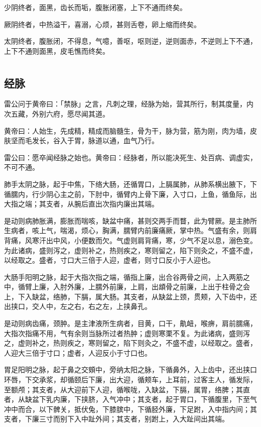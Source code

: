 \documentclass[a4paper,12pt,UTF8,twoside]{ctexbook}
\begin{document}
	少阴终者，面黑，齿长而垢，腹胀闭塞，上下不通而终矣。
	
	厥阴终者，中热溢干，喜溺，心烦，甚则舌卷，卵上缩而终矣。
	
	太阴终者，腹胀闭，不得息，气噫，善呕，呕则逆，逆则面赤，不逆则上下不通，上下不通则面黑，皮毛憔而终矣。
	
	\part{}
	\chapter{经脉}
	
	雷公问于黄帝曰：「禁脉」之言，凡刺之理，经脉为始，营其所行，制其度量，内次五藏，外别六府，愿尽闻其道。
	
	黄帝曰：人始生，先成精，精成而脑髓生，骨为干，脉为营，筋为刚，肉为墙，皮肤坚而毛发长，谷入于胃，脉道以通，血气乃行。
	
	雷公曰：愿卒闻经脉之始也。黄帝曰：经脉者，所以能决死生、处百病、调虚实，不可不通。
	
	肺手太阴之脉，起于中焦，下络大肠，还循胃口，上膈属肺，从肺系横出腋下，下循臑内，行少阴心主之前，下肘中，循臂内上骨下廉，入寸口，上鱼，循鱼际，出大指之端；其支者，从腕后直出次指内廉出其端。
	
	是动则病肺胀满，膨胀而喘咳，缺盆中痛，甚则交两手而瞀，此为臂厥。是主肺所生病者，咳上气，喘渴，烦心，胸满，臑臂内前廉痛厥，掌中热。气盛有余，则肩背痛，风寒汗出中风，小便数而欠。气虚则肩背痛，寒，少气不足以息，溺色变。为此诸病，盛则泻之，虚则补之，热则疾之，寒则留之，陷下则灸之，不盛不虚，以经取之。盛者，寸口大三倍于人迎，虚者，则寸口反小于人迎也。
	
	大肠手阳明之脉，起于大指次指之端，循指上廉，出合谷两骨之间，上入两筋之中，循臂上廉，入肘外廉，上臑外前廉，上肩，出䪼骨之前廉，上出于柱骨之会上，下入缺盆，络肺，下膈，属大肠。其支者，从缺盆上颈，贯颊，入下齿中，还出挟口，交人中，左之右，右之左，上挟鼻孔。
	
	是动则病齿痛，颈肿。是主津液所生病者，目黄，口干，鼽衄，喉痹，肩前臑痛，大指次指痛不用，气有余则当脉所过者热肿；虚则寒栗不复。为此诸病，盛则泻之，虚则补之，热则疾之，寒则留之，陷下则灸之，不盛不虚，以经取之。盛者，人迎大三倍于寸口；虚者，人迎反小于寸口也。
	
	胃足阳明之脉，起于鼻之交頞中，旁纳太阳之脉，下循鼻外，入上齿中，还出挟口环唇，下交承浆，却循颐后下廉，出大迎，循颊车，上耳前，过客主人，循发际，至额颅；其支者，从大迎前下人迎，循喉咙，入缺盆，下膈，属胃，络脾；其直者，从缺盆下乳内廉，下挟脐，入气冲中；其支者，起于胃口，下循腹里，下至气冲中而合，以下髀关，抵伏兔，下膝膑中，下循胫外廉，下足跗，入中指内间；其支者，下廉三寸而别下入中趾外间；其支者，别跗上，入大趾间出其端。
	
\end{document}
